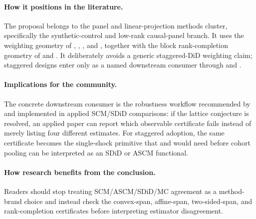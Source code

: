 \documentclass[11pt]{article}
\theoremstyle{definition}
\theoremstyle{plain}
\theoremstyle{remark}
\begin{document}
\paragraph{How it positions in the literature.}
The proposal belongs to the panel and linear-projection methods cluster,
specifically the synthetic-control and low-rank causal-panel branch. It uses
the weighting geometry of \citet{AbadieDiamondHainmueller2010},
\citet{DoudchenkoImbens2016}, \citet{BenMichaelFellerRothstein2021}, and
\citet{ArkhangelskyAtheyHirshbergImbensWager2021}, together with the block
rank-completion geometry of \citet{Xu2017} and
\citet{AtheyBayatiDoudchenkoImbensKhosravi2021}. It deliberately avoids a
generic staggered-DiD weighting claim; staggered designs enter only as a named
downstream consumer through \citet{BenMichaelFellerRothstein2022} and
\citet{ArkhangelskyImbensLeiLuo2024}.

\paragraph{Implications for the community.}
The concrete downstream consumer is the robustness workflow recommended by
\citet{DoudchenkoImbens2016} and implemented in applied SCM/SDiD comparisons:
if the lattice conjecture is resolved, an applied paper can report which
observable certificate fails instead of merely listing four different
estimates. For staggered adoption, the same certificate becomes the
single-shock primitive that \citet{BenMichaelFellerRothstein2022} and
\citet{ArkhangelskyImbensLeiLuo2024} would need before cohort pooling can be
interpreted as an SDiD or ASCM functional.

\paragraph{How research benefits from the conclusion.}
Readers should stop treating SCM/ASCM/SDiD/MC agreement as a method-brand
choice and instead check the convex-span, affine-span, two-sided-span, and
rank-completion certificates before interpreting estimator disagreement.
\end{document}
